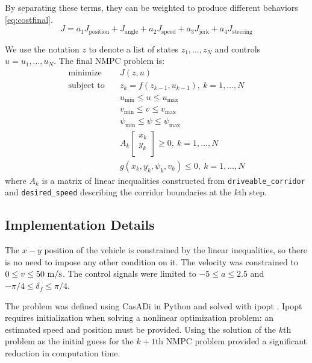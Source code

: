 \documentclass[letterpaper, 10 pt, conference]{ieeeconf}  %
\begin{document}
 By separating these terms, they can be weighted to produce different behaviors \eqref{eq:costfinal}.
 \begin{equation}
 J = a_1 J_{\text{position}} + J_{\text{angle}} + a_2 J_{\text{speed}} + a_3 J_{\text{jerk}} + a_4 J_{\text{steering}}
 \label{eq:costfinal}
 \end{equation}
 
 We use the notation $z$ to denote a list of states $z_1,\dots,z_N$ and controls $u=u_1,\dots,u_N$.
 The final NMPC problem is:
 \begin{align}
 \text{minimize}\quad& J(z, u)
 \\
 \text{subject to} \quad& z_{k} = f(z_{k-1}, u_{k-1}),\ k=1,\dots,N
 \\
 & u_{\min} \leq u \leq u_{\max}
 \\
 & v_{\min} \leq v \leq v_{\max}
 \\
 & \psi_{\min} \leq \psi \leq \psi_{\max}
 \\
 &
 A_k\begin{bmatrix}
 x_k\\y_k\\
 \end{bmatrix} \geq 0,\ k=1,\dots,N
 \\
 &
g(x_k, y_k, \psi_k, v_k) \leq 0,\ k=1,\dots,N
 \end{align}
 where $A_k$ is a matrix of linear inequalities constructed from \texttt{driveable\_corridor} and \texttt{desired\_speed} describing the corridor boundaries at the $k$th step.
 
 
 \subsection{Implementation Details}
The $x-y$ position of the vehicle is constrained by the linear inequalities, so there is no need to impose any other condition on it. The velocity was constrained to $0 \leq v \leq 50\ \text{m}/\text{s}$.
The control signals were limited to $-5 \leq a \leq 2.5$ and $-\pi/4 \leq \delta_f \leq \pi/4$.
 
 The problem was defined using CasADi in Python and solved with ipopt \cite{Casadi} \cite{ipopt}. Ipopt requires initialization when solving a nonlinear optimization problem: an estimated speed and position must be provided. Using the solution of the $k$th problem as the initial guess for the $k+1$th NMPC problem provided a significant reduction in computation time.
 
\end{document}
